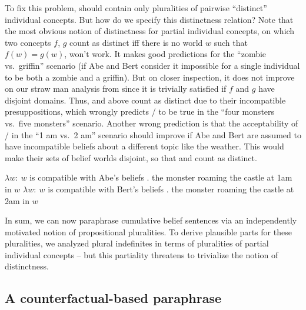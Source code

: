 \documentclass[output=paper]{langscibook}
\begin{document}
\noindent To fix this problem,   should contain only pluralities of pairwise ``distinct'' individual concepts. But how do we specify this distinctness relation? Note that the most obvious notion of distinctness for partial individual concepts, on which two concepts $f$, $g$ count as distinct iff there is no world $w$ such that $f(w) = g(w)$, won't work. It makes good predictions for the ``zombie vs.~griffin'' scenario (if Abe and Bert consider it impossible for a single individual to be both a zombie and a griffin). But on closer inspection, it does not improve on our straw man analysis from  since it is trivially satisfied if $f$ and $g$ have disjoint domains. Thus,  and  above count as distinct due to their incompatible presuppositions, which wrongly predicts / to be true in the ``four monsters vs.~five monsters'' scenario. Another wrong prediction is that the acceptability of / in the ``1 am vs.~2 am'' scenario should improve if Abe and Bert are assumed to have incompatible beliefs about a different topic like the weather. This would make their sets of belief worlds disjoint, so that  and  count as distinct.

\ea \label{sch-has:ex:36}
\ea \label{sch-has:ex:36a} $\lambda w :\ w$ is compatible with Abe's beliefs . the monster roaming the castle at 1am in $w$
\ex \label{sch-has:ex:36b} $\lambda w :\ w$ is compatible with Bert's beliefs . the monster roaming the castle at 2am in $ w$ \z\z

\noindent In sum, we can now paraphrase cumulative belief sentences via an independently motivated notion of propositional pluralities. To derive plausible parts for these pluralities, we analyzed plural indefinites in terms of pluralities of partial individual concepts --  but this partiality threatens to trivialize the notion of distinctness.

\subsection{A counterfactual-based paraphrase}
\end{document}
